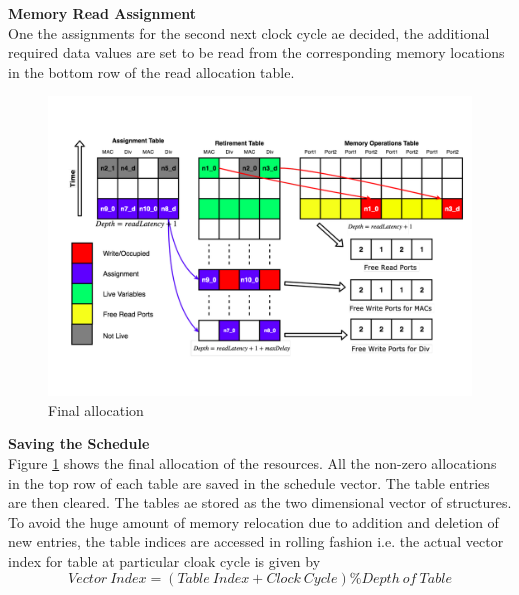 \textbf{Memory Read Assignment}\\
One the assignments for the second next clock cycle ae decided, the additional 
required data values are set to be read from the corresponding memory locations in the
bottom row of the read allocation table.

\begin{figure}
    \centering
    \includegraphics[width = \linewidth]{./Scheduler/exampleFinal.pdf}
    \caption{Final allocation}
    \label{fig:sch:exampleFinal}
\end{figure}

\textbf{Saving the Schedule} \\
Figure \ref{fig:sch:exampleFinal} shows the final allocation of the resources. 
All the non-zero allocations in the top row of each table are 
saved in the schedule vector. The table entries are then cleared. 
The tables ae stored as the two dimensional vector of structures. To avoid the huge amount
of memory relocation due to addition and deletion of new entries, the table indices
are accessed in rolling fashion i.e. the actual vector index for table at particular
cloak cycle is given by
$$
Vector\ Index  = (Table\ Index + Clock\ Cycle) \% Depth\ of\ Table
$$